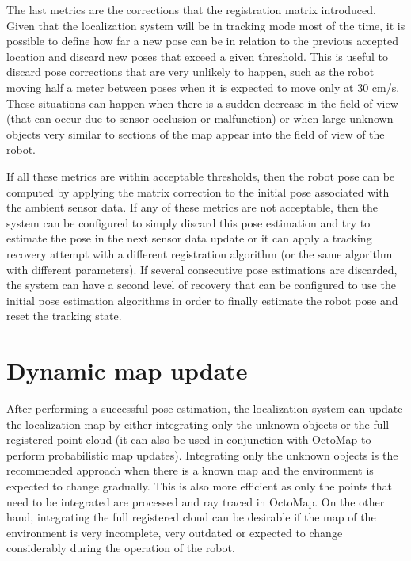 The last metrics are the corrections that the registration matrix introduced. Given that the localization system will be in tracking mode most of the time, it is possible to define how far a new pose can be in relation to the previous accepted location and discard new poses that exceed a given threshold. This is useful to discard pose corrections that are very unlikely to happen, such as the robot moving half a meter between poses when it is expected to move only at 30 cm/s. These situations can happen when there is a sudden decrease in the field of view (that can occur due to sensor occlusion or malfunction) or when large unknown objects very similar to sections of the map appear into the field of view of the robot.

If all these metrics are within acceptable thresholds, then the robot pose can be computed by applying the matrix correction to the initial pose associated with the ambient sensor data. If any of these metrics are not acceptable, then the system can be configured to simply discard this pose estimation and try to estimate the pose in the next sensor data update or it can apply a tracking recovery attempt with a different registration algorithm (or the same algorithm with different parameters). If several consecutive pose estimations are discarded, the system can have a second level of recovery that can be configured to use the initial pose estimation algorithms in order to finally estimate the robot pose and reset the tracking state.



\section{Dynamic map update}

After performing a successful pose estimation, the localization system can update the localization map by either integrating only the unknown objects or the full registered point cloud (it can also be used in conjunction with OctoMap \cite{Hornung2013} to perform probabilistic map updates). Integrating only the unknown objects is the recommended approach when there is a known map and the environment is expected to change gradually. This is also more efficient as only the points that need to be integrated are processed and ray traced in OctoMap. On the other hand, integrating the full registered cloud can be desirable if the map of the environment is very incomplete, very outdated or expected to change considerably during the operation of the robot.
